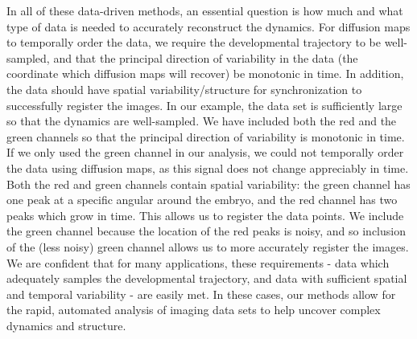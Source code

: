 \documentclass{pnastwo}
\begin{document}
\begin{article}
In all of these data-driven methods, an essential question is how much and what type of data is needed to accurately reconstruct the dynamics.
%
For diffusion maps to temporally order the data, we require the developmental trajectory to be well-sampled, and that the principal direction of variability in the data (the coordinate which diffusion maps will recover) be monotonic in time.
%
In addition, the data should have spatial variability/structure for synchronization to successfully register the images.
%
In our example, the data set is sufficiently large so that the dynamics are well-sampled.
%
We have included both the red and the green channels so that the principal direction of variability is monotonic in time.
%
If we only used the green channel in our analysis, we could not temporally order the data using diffusion maps, as this signal does not change appreciably in time.
%
Both the red and green channels contain spatial variability: the green channel has one peak at a specific angular around the embryo, and the red channel has two peaks which grow in time.
%
This allows us to register the data points.
%
We include the green channel because the location of the red peaks is noisy, and so inclusion of the (less noisy) green channel allows us to more accurately register the images.
%
%
%
%
%
%
%
We are confident that for many applications, these requirements - data which adequately samples the developmental trajectory, and data with sufficient spatial and temporal variability - are easily met.
%
In these cases, our methods allow for the rapid, automated analysis of imaging data sets to help uncover complex dynamics and structure.



\end{article}
\end{document}
